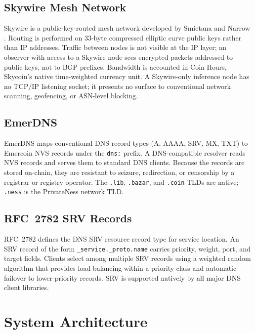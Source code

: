\documentclass[11pt,a4paper]{article}
\theoremstyle{definition}
\begin{document}
\subsection{Skywire Mesh Network}

Skywire is a public-key-routed mesh network developed by Smietana and Narrow
\cite{skywire}.  Routing is performed on 33-byte compressed elliptic curve
public keys rather than IP addresses.  Traffic between nodes is not visible at
the IP layer; an observer with access to a Skywire node sees encrypted packets
addressed to public keys, not to BGP prefixes.  Bandwidth is accounted in Coin
Hours, Skycoin's native time-weighted currency unit.  A Skywire-only inference
node has no TCP/IP listening socket; it presents no surface to conventional
network scanning, geofencing, or ASN-level blocking.

\subsection{EmerDNS}

EmerDNS maps conventional DNS record types (A, AAAA, SRV, MX, TXT) to
Emercoin NVS records under the \texttt{dns:} prefix.  A DNS-compatible resolver
reads NVS records and serves them to standard DNS clients.  Because the records
are stored on-chain, they are resistant to seizure, redirection, or censorship by a
registrar or registry operator.  The \texttt{.lib}, \texttt{.bazar}, and
\texttt{.coin} TLDs are native; \texttt{.ness} is the PrivateNess network TLD.

\subsection{RFC~2782 SRV Records}

RFC~2782 \cite{rfc2782} defines the DNS SRV resource record type for
service location.  An SRV record of the form \texttt{\_service.\_proto.name}
carries priority, weight, port, and target fields.  Clients select among
multiple SRV records using a weighted random algorithm that provides
load balancing within a priority class and automatic failover to lower-priority
records.  SRV is supported natively by all major DNS client libraries.

\section{System Architecture}
\label{sec:architecture}
\end{document}
